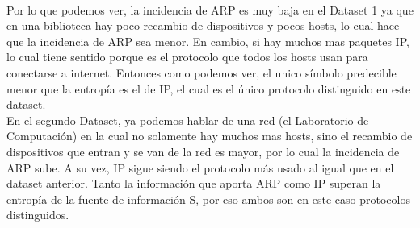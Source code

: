  \\


Por lo que podemos ver, la incidencia de ARP es muy baja en el Dataset 1 ya que en una biblioteca hay poco recambio de dispositivos y pocos hosts, lo cual hace que la incidencia de ARP sea menor. En cambio, si hay muchos mas paquetes IP, lo cual tiene sentido porque es el protocolo que todos los hosts usan para conectarse a internet. Entonces como podemos ver, el unico símbolo predecible menor que la entropía es el de IP, el cual es el único protocolo distinguido en este dataset. \\

En el segundo Dataset, ya podemos hablar de una red (el Laboratorio de Computación) en la cual no solamente hay muchos mas hosts, sino el recambio de dispositivos que entran y se van de la red es mayor, por lo cual la incidencia de ARP sube. A su vez, IP sigue siendo el protocolo más usado al igual que en el dataset anterior. Tanto la información que aporta ARP como IP superan la entropía de la fuente de información S, por eso ambos son en este caso protocolos distinguidos. \\

